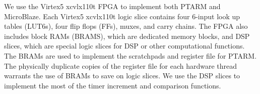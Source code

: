 We use the Virtex5 xcvlx110t FPGA to implement both PTARM and MicroBlaze.
Each Virtex5 xcvlx110t logic slice contains four 6-input look up tables (LUT6s), four flip flops (FFs), muxes, and carry chains.
The FPGA also includes block RAMs (BRAMS), which are dedicated memory blocks, and DSP slices, which are special logic slices for DSP or other computational functions.
The BRAMs are used to implement the scratchpads and register file for PTARM. 
The physically duplicate copies of the register file for each hardware thread warrants the use of BRAMs to save on logic slices.
We use the DSP slices to implement the most of the timer increment and comparison functions.

\begin{table}[h]
\vspace{-5pt}
\noindent{}
\end{table}
